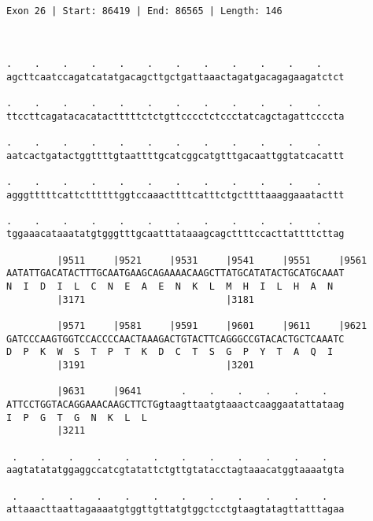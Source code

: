 \documentclass{article}
\begin{document}
\begin{Verbatim}
     
 
Exon 26 | Start: 86419 | End: 86565 | Length: 146



.    .    .    .    .    .    .    .    .    .    .    .    
agcttcaatccagatcatatgacagcttgctgattaaactagatgacagagaagatctct
                                                            
.    .    .    .    .    .    .    .    .    .    .    .    
ttccttcagatacacatactttttctctgttcccctctccctatcagctagattccccta
                                                            
.    .    .    .    .    .    .    .    .    .    .    .    
aatcactgatactggttttgtaattttgcatcggcatgtttgacaattggtatcacattt
                                                            
.    .    .    .    .    .    .    .    .    .    .    .    
agggtttttcattcttttttggtccaaacttttcatttctgcttttaaaggaaatacttt
                                                            
.    .    .    .    .    .    .    .    .    .    .    .    
tggaaacataaatatgtgggtttgcaatttataaagcagcttttccacttattttcttag
                                                            
         |9511     |9521     |9531     |9541     |9551     |9561
AATATTGACATACTTTGCAATGAAGCAGAAAACAAGCTTATGCATATACTGCATGCAAAT
N  I  D  I  L  C  N  E  A  E  N  K  L  M  H  I  L  H  A  N  
         |3171                         |3181                
  
         |9571     |9581     |9591     |9601     |9611     |9621
GATCCCAAGTGGTCCACCCCAACTAAAGACTGTACTTCAGGGCCGTACACTGCTCAAATC
D  P  K  W  S  T  P  T  K  D  C  T  S  G  P  Y  T  A  Q  I  
         |3191                         |3201                
  
         |9631     |9641       .    .    .    .    .    .   
ATTCCTGGTACAGGAAACAAGCTTCTGgtaagttaatgtaaactcaaggaatattataag
I  P  G  T  G  N  K  L  L                                   
         |3211                                              
  
 .    .    .    .    .    .    .    .    .    .    .    .   
aagtatatatggaggccatcgtatattctgttgtatacctagtaaacatggtaaaatgta
                                                            
 .    .    .    .    .    .    .    .    .    .    .    .   
attaaacttaattagaaaatgtggttgttatgtggctcctgtaagtatagttatttagaa
                                                            

\end{Verbatim}
\end{document}
